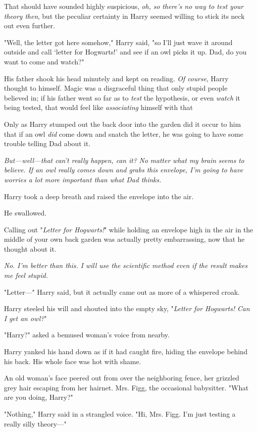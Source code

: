 That should have sounded highly suspicious, \emph{oh, so there's
no way to test your theory then}, but the peculiar
certainty in Harry seemed willing to stick its neck out even further.

"Well, the letter got here somehow," Harry said, "so I'll
just wave it around outside and call `letter for Hogwarts!'
and see if an owl picks it up. Dad, do you want to come and watch?"

His father shook his head minutely and kept on reading.
\emph{Of course}, Harry thought to himself. Magic was a
disgraceful thing that only stupid people believed in; if his
father went so far as to \emph{test} the hypothesis, or even
\emph{watch} it being tested, that would feel like \emph{associating}
himself with that{\el}

Only as Harry stumped out the back door into the garden
did it occur to him that if an owl \emph{did} come down and
snatch the letter, he was going to have some trouble
telling Dad about it.

\emph{But—well—that can't \emph{really} happen, can it? No matter
what my brain seems to believe. If an owl really comes
down and grabs this envelope, I'm going to have worries
a lot more important than what Dad thinks.}

Harry took a deep breath and raised the envelope into the air.

He swallowed.

Calling out "\emph{Letter for Hogwarts!}" while holding an envelope
high in the air in the middle of your own back garden
was{\el} actually pretty embarrassing, now that he thought
about it.

\emph{No. I'm better than this. I will use the scientific method
even if the result makes me feel stupid.}

"Letter—" Harry said, but it actually came out as more of a
whispered croak.

Harry steeled his will and shouted into the empty sky,
"\emph{Letter for Hogwarts! Can I get an owl?}"

"Harry?" asked a bemused woman's voice from nearby.

Harry yanked his hand down as if it had caught fire,
hiding the envelope behind his back. His whole face was hot with shame.

An old woman's face peered out from over the
neighboring fence, her grizzled grey hair escaping from her
hairnet. Mrs. Figg, the occasional babysitter. "What are you
doing, Harry?"

"Nothing," Harry said in a strangled voice. "Hi, Mrs. Figg.
I'm just{\el} testing a really silly theory—"

